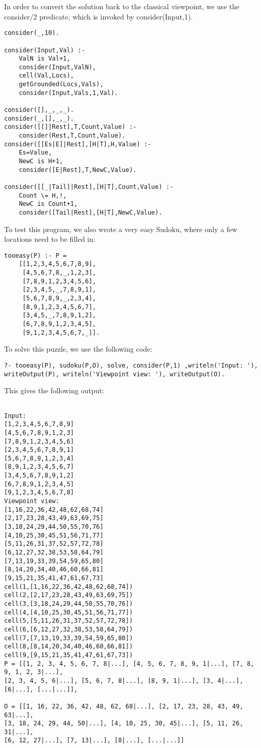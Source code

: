 	
In order to convert the solution back to the classical viewpoint, we use the consider/2 predicate, which is invoked by consider(Input,1).
\begin{lstlisting}
consider(_,10).

consider(Input,Val) :-
	ValN is Val+1,
	consider(Input,ValN),
	cell(Val,Locs),
	getGrounded(Locs,Vals),
	consider(Input,Vals,1,Val).

consider([],_,_,_).
consider(_,[],_,_).
consider([[]|Rest],T,Count,Value) :-
	consider(Rest,T,Count,Value).
consider([[Es|E]|Rest],[H|T],H,Value) :-
	Es=Value,
	NewC is H+1,
	consider([E|Rest],T,NewC,Value).

consider([[_|Tail]|Rest],[H|T],Count,Value) :-
	Count \= H,!,
	NewC is Count+1,
	consider([Tail|Rest],[H|T],NewC,Value).
\end{lstlisting}

	
	
To test this program, we also wrote a very easy Sudoku, where only a few locations need to be filled in:

\begin{lstlisting}
tooeasy(P) :- P =
	[[1,2,3,4,5,6,7,8,9],
	 [4,5,6,7,8,_,1,2,3],
	 [7,8,9,1,2,3,4,5,6],
	 [2,3,4,5,_,7,8,9,1],
	 [5,6,7,8,9,_,2,3,4],
	 [8,9,1,2,3,4,5,6,7],
	 [3,4,5,_,7,8,9,1,2],
	 [6,7,8,9,1,2,3,4,5],
	 [9,1,2,3,4,5,6,7,_]]. 
\end{lstlisting}

	 
To solve this puzzle, we use the following code:
\begin{lstlisting}
?- tooeasy(P), sudoku(P,O), solve, consider(P,1) ,writeln('Input: '), writeOutput(P), writeln('Viewpoint view: '), writeOutput(O).
\end{lstlisting}


 
This gives the following output:
\begin{verbatim}

Input: 
[1,2,3,4,5,6,7,8,9]
[4,5,6,7,8,9,1,2,3]
[7,8,9,1,2,3,4,5,6]
[2,3,4,5,6,7,8,9,1]
[5,6,7,8,9,1,2,3,4]
[8,9,1,2,3,4,5,6,7]
[3,4,5,6,7,8,9,1,2]
[6,7,8,9,1,2,3,4,5]
[9,1,2,3,4,5,6,7,8]
Viewpoint view: 
[1,16,22,36,42,48,62,68,74]
[2,17,23,28,43,49,63,69,75]
[3,18,24,29,44,50,55,70,76]
[4,10,25,30,45,51,56,71,77]
[5,11,26,31,37,52,57,72,78]
[6,12,27,32,38,53,58,64,79]
[7,13,19,33,39,54,59,65,80]
[8,14,20,34,40,46,60,66,81]
[9,15,21,35,41,47,61,67,73]
cell(1,[1,16,22,36,42,48,62,68,74])
cell(2,[2,17,23,28,43,49,63,69,75])
cell(3,[3,18,24,29,44,50,55,70,76])
cell(4,[4,10,25,30,45,51,56,71,77])
cell(5,[5,11,26,31,37,52,57,72,78])
cell(6,[6,12,27,32,38,53,58,64,79])
cell(7,[7,13,19,33,39,54,59,65,80])
cell(8,[8,14,20,34,40,46,60,66,81])
cell(9,[9,15,21,35,41,47,61,67,73])
P = [[1, 2, 3, 4, 5, 6, 7, 8|...], [4, 5, 6, 7, 8, 9, 1|...], [7, 8, 9, 1, 2, 3|...], 
[2, 3, 4, 5, 6|...], [5, 6, 7, 8|...], [8, 9, 1|...], [3, 4|...], [6|...], [...|...]],

O = [[1, 16, 22, 36, 42, 48, 62, 68|...], [2, 17, 23, 28, 43, 49, 63|...], 
[3, 18, 24, 29, 44, 50|...], [4, 10, 25, 30, 45|...], [5, 11, 26, 31|...],
[6, 12, 27|...], [7, 13|...], [8|...], [...|...]] 
\end{verbatim}

